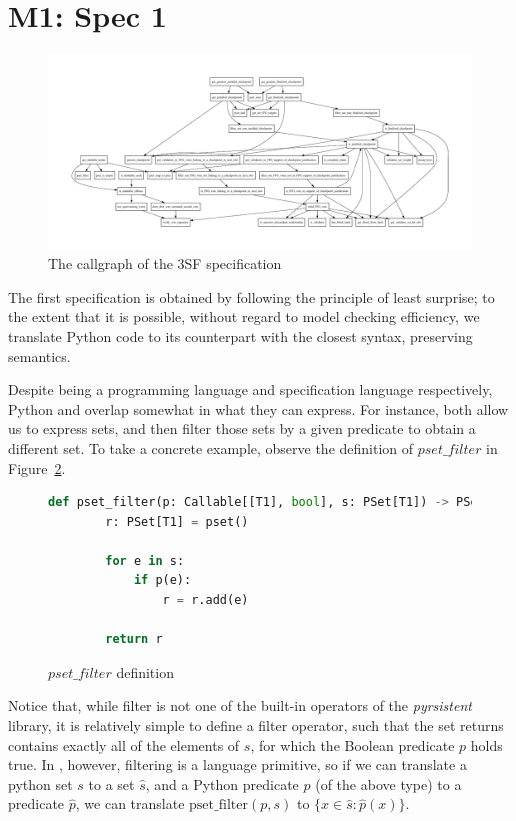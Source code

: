 
\section{M1: Spec 1}

\begin{figure}
    \centering
    \includegraphics[width=\textwidth,angle=-90]{ffg-callgraph.pdf}
    \caption{The callgraph of the 3SF specification}
    \label{fig:your_label}
\end{figure}

    The first specification is obtained by following the principle of least surprise; to the extent that it is possible, without regard to model checking efficiency, we translate Python code to its \tlap{} counterpart with the closest syntax, preserving semantics.

    Despite being a programming language and specification language respectively, Python and \tlap{} overlap somewhat in what they can express. 
    For instance, both allow us to express sets, and then filter those sets by a given predicate to obtain a different set.
    To take a concrete example, observe the definition of $pset\_filter$ in Figure~\ref{py_filter}.
    \begin{figure}
    \begin{lstlisting}[language=Python]
    def pset_filter(p: Callable[[T1], bool], s: PSet[T1]) -> PSet[T1]:
        r: PSet[T1] = pset()

        for e in s:
            if p(e):
                r = r.add(e)

        return r
    \end{lstlisting}
    \caption{$pset\_filter$ definition \label{py_filter}}
    \end{figure}
    Notice that, while filter is not one of the built-in operators of the \emph{pyrsistent} library, it is relatively simple to define a filter operator, such that the set returns contains exactly all of the elements of $s$, for which the Boolean predicate $p$ holds true.
    In \tlap{}, however, filtering is a language primitive, so if we can translate a python set $s$ to a \tlap{} set $\hat{s}$, and a Python predicate $p$ (of the above type) to a \tlap{} predicate $\hat{p}$, we can translate $\mathrm{pset\_filter}(p, s)$ to $\{ x \in \hat{s}\colon \hat{p}(x) \}$.

